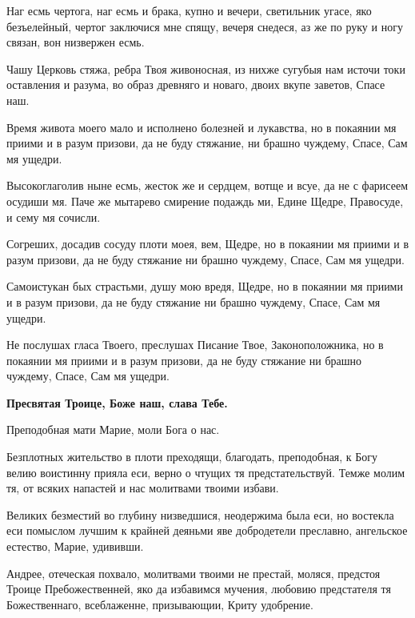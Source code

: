 Наг есмь чертога, наг есмь и брака, купно и вечери, светильник угасе, яко безъелейный, чертог заключися мне спящу, вечеря снедеся, аз же по руку и ногу связан, вон низвержен есмь.


Чашу Церковь стяжа, ребра Твоя живоносная, из нихже сугубыя нам источи токи оставления и разума, во образ древняго и новаго, двоих вкупе заветов, Спасе наш.


Время живота моего мало и исполнено болезней и лукавства, но в покаянии мя приими и в разум призови, да не буду стяжание, ни брашно чуждему, Спасе, Сам мя ущедри.


Высокоглаголив ныне есмь, жесток же и сердцем, вотще и всуе, да не с фарисеем осудиши мя. Паче же мытарево смирение подаждь ми, Едине Щедре, Правосуде, и сему мя сочисли.


Согреших, досадив сосуду плоти моея, вем, Щедре, но в покаянии мя приими и в разум призови, да не буду стяжание ни брашно чуждему, Спасе, Сам мя ущедри.


Самоистукан бых страстьми, душу мою вредя, Щедре, но в покаянии мя приими и в разум призови, да не буду стяжание ни брашно чуждему, Спасе, Сам мя ущедри.


Не послушах гласа Твоего, преслушах Писание Твое, Законоположника, но в покаянии мя приими и в разум призови, да не буду стяжание ни брашно чуждему, Спасе, Сам мя ущедри.


\bfseries Пресвятая Троице, Боже наш, слава Тебе.





Преподобная мати Марие, моли Бога о нас.\normalfont{}


Безплотных жительство в плоти преходящи, благодать, преподобная, к Богу велию воистинну прияла еси, верно о чтущих тя предстательствуй. Темже молим тя, от всяких напастей и нас молитвами твоими избави.




Великих безместий во глубину низведшися, неодержима была еси, но востекла еси помыслом лучшим к крайней деяньми яве добродетели преславно, ангельское естество, Марие, удививши.




Андрее, отеческая похвало, молитвами твоими не престай, моляся, предстоя Троице Пребожественней, яко да избавимся мучения, любовию предстателя тя Божественнаго, всеблаженне, призывающии, Криту удобрение.


